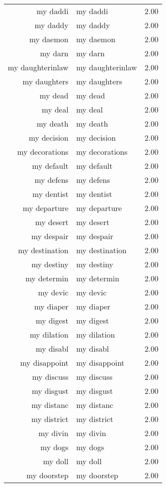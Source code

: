 \begin{table}[ht]
\begin{tabular}{rlr}
  my daddi & my daddi & 2.00 \\ 
  my daddy & my daddy & 2.00 \\ 
  my daemon & my daemon & 2.00 \\ 
  my darn & my darn & 2.00 \\ 
  my daughterinlaw & my daughterinlaw & 2.00 \\ 
  my daughters & my daughters & 2.00 \\ 
  my dead & my dead & 2.00 \\ 
  my deal & my deal & 2.00 \\ 
  my death & my death & 2.00 \\ 
  my decision & my decision & 2.00 \\ 
  my decorations & my decorations & 2.00 \\ 
  my default & my default & 2.00 \\ 
  my defens & my defens & 2.00 \\ 
  my dentist & my dentist & 2.00 \\ 
  my departure & my departure & 2.00 \\ 
  my desert & my desert & 2.00 \\ 
  my despair & my despair & 2.00 \\ 
  my destination & my destination & 2.00 \\ 
  my destiny & my destiny & 2.00 \\ 
  my determin & my determin & 2.00 \\ 
  my devic & my devic & 2.00 \\ 
  my diaper & my diaper & 2.00 \\ 
  my digest & my digest & 2.00 \\ 
  my dilation & my dilation & 2.00 \\ 
  my disabl & my disabl & 2.00 \\ 
  my disappoint & my disappoint & 2.00 \\ 
  my discuss & my discuss & 2.00 \\ 
  my disgust & my disgust & 2.00 \\ 
  my distanc & my distanc & 2.00 \\ 
  my district & my district & 2.00 \\ 
  my divin & my divin & 2.00 \\ 
  my dogs & my dogs & 2.00 \\ 
  my doll & my doll & 2.00 \\ 
  my doorstep & my doorstep & 2.00 \\ 

\end{tabular}
\end{table}
